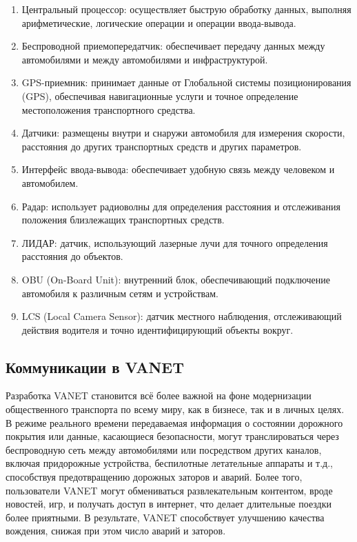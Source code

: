 \begin{enumerate}
    \item Центральный процессор: осуществляет быструю обработку данных, выполняя арифметические, логические операции и операции ввода-вывода.
    \item Беспроводной приемопередатчик: обеспечивает передачу данных между автомобилями и между автомобилями и инфраструктурой.
    \item GPS-приемник: принимает данные от Глобальной системы позиционирования (GPS), обеспечивая навигационные услуги и точное определение местоположения транспортного средства.
    \item Датчики: размещены внутри и снаружи автомобиля для измерения скорости, расстояния до других транспортных средств и других параметров.
    \item Интерфейс ввода-вывода: обеспечивает удобную связь между человеком и автомобилем.
    \item Радар: использует радиоволны для определения расстояния и отслеживания положения близлежащих транспортных средств.
    \item ЛИДАР: датчик, использующий лазерные лучи для точного определения расстояния до объектов.
    \item OBU (On-Board Unit): внутренний блок, обеспечивающий подключение автомобиля к различным сетям и устройствам.
    \item LCS (Local Camera Sensor): датчик местного наблюдения, отслеживающий действия водителя и точно идентифицирующий объекты вокруг.
\end{enumerate}

\newpage

\subsection*{Коммуникации в VANET}

Разработка VANET становится всё более важной на фоне модернизации общественного транспорта по всему миру, как в бизнесе, так и в личных целях. В режиме реального времени передаваемая информация о состоянии дорожного покрытия или данные, касающиеся безопасности, могут транслироваться через беспроводную сеть между автомобилями или посредством других каналов, включая придорожные устройства, беспилотные летательные аппараты и т.д., способствуя предотвращению дорожных заторов и аварий. Более того, пользователи VANET могут обмениваться развлекательным контентом, вроде новостей, игр, и получать доступ в интернет, что делает длительные поездки более приятными. В результате, VANET способствует улучшению качества вождения, снижая при этом число аварий и заторов.

